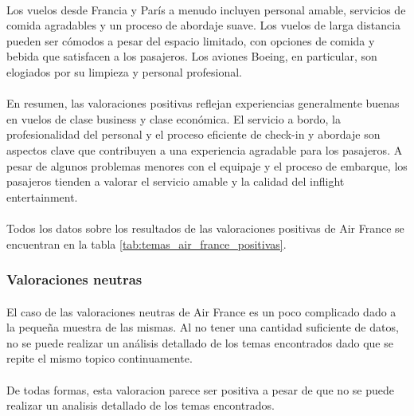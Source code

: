 \documentclass{report}
\begin{document}
{                    \paragraph*{}{
                        Los vuelos desde Francia y París a menudo incluyen personal amable, servicios de comida agradables y un proceso de abordaje suave. Los vuelos de larga distancia pueden ser cómodos a pesar del espacio limitado, con opciones de comida y bebida que satisfacen a los pasajeros. Los aviones Boeing, en particular, son elogiados por su limpieza y personal profesional.
                    }
                    \paragraph*{}{
                        En resumen, las valoraciones positivas reflejan experiencias generalmente buenas en vuelos de clase business y clase económica. El servicio a bordo, la profesionalidad del personal y el proceso eficiente de check-in y abordaje son aspectos clave que contribuyen a una experiencia agradable para los pasajeros. A pesar de algunos problemas menores con el equipaje y el proceso de embarque, los pasajeros tienden a valorar el servicio amable y la calidad del inflight entertainment.
                    }
                    \paragraph*{}{
                        Todos los datos sobre los resultados de las valoraciones positivas de Air France se encuentran en la tabla \ref{tab:temas_air_france_positivas}.
                    }
                \subsubsection*{Valoraciones neutras}
                    \paragraph*{}{
                        El caso de las valoraciones neutras de Air France es un poco complicado dado a la pequeña muestra de las mismas.
                        Al no tener una cantidad suficiente de datos, no se puede realizar un análisis detallado de los temas encontrados dado que se repite el mismo topico continuamente.
                    }
                    \paragraph*{}{
                        De todas formas, esta valoracion parece ser positiva a pesar de que no se puede realizar un analisis detallado de los temas encontrados.
                    }
}
\end{document}
